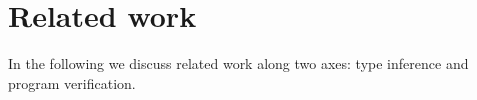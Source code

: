\documentclass{sig-alternate}
\newcommand{\codeid}[1]{\ifmmode{\mbox{\ttfamily{#1}}}\else{\ttfamily #1}\fi}
\newcommand{\todo}[1]{{\color{red}\bfseries [[#1]]}}
\begin{document}
\section{Related work}
\label{sec:related-work}

In the following we discuss related work along two axes: type
inference and program verification.


% 
% 
% 
% 
\end{document}

